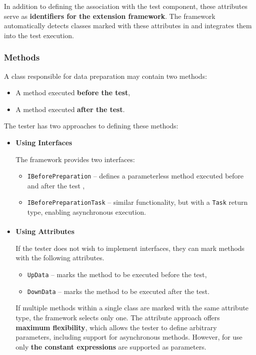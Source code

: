 In addition to defining the association with the test component, these attributes serve as \textbf{identifiers for the extension framework}. The framework automatically detects classes marked with these attributes in  and integrates them into the test execution.

\subsubsection{Methods}

A class responsible for data preparation may contain two methods:

\begin{itemize}
    \item A method executed \textbf{before the test},
    \item A method executed \textbf{after the test}.
\end{itemize}

The tester has two approaches to defining these methods:
\begin{itemize}
\paragraph{}
\item \textbf{Using Interfaces}
\newline

The framework provides two interfaces:

\begin{itemize}
    \item \texttt{IBeforePreparation} – defines a parameterless method executed before and after the test ,
    \item \texttt{IBeforePreparationTask} – similar functionality, but with a \texttt{Task} return type, enabling asynchronous execution.
\end{itemize}
\paragraph{}
\item \textbf{Using Attributes}
\newline

If the tester does not wish to implement interfaces, they can mark methods with the following attributes.

\begin{itemize}
    \item \texttt{UpData} – marks the method to be executed before the test,
    \item \texttt{DownData} – marks the method to be executed after the test.
\end{itemize}

If multiple methods within a single class are marked with the same attribute type, the framework selects only one. The attribute approach offers \textbf{maximum flexibility}, which allows the tester to define arbitrary parameters, including support for asynchronous methods. However, for use only \textbf{the constant expressions} are supported as parameters.
\end{itemize}
